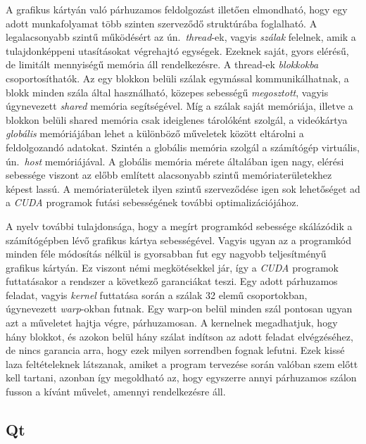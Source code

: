 \documentclass[a4paper,12pt]{article}
\begin{document}
A grafikus kártyán való párhuzamos feldolgozást illetően elmondható, hogy egy adott munkafolyamat több szinten szerveződő struktúrába foglalható.  A legalacsonyabb szintű működésért az ún.\ \emph{thread}-ek, vagyis \emph{szálak} felelnek, amik a tulajdonképpeni utasításokat végrehajtó egységek. Ezeknek saját, gyors elérésű, de limitált mennyiségű memória áll rendelkezésre. A thread-ek \emph{blokkokba} csoportosíthatók. Az egy blokkon belüli szálak egymással kommunikálhatnak, a blokk minden szála által használható, közepes sebességű \emph{megosztott}, vagyis úgynevezett \emph{shared} memória segítségével. Míg a szálak saját memóriája, illetve a blokkon belüli shared memória csak ideiglenes tárolóként szolgál, a videókártya \emph{globális} memóriájában lehet a különböző műveletek között eltárolni a feldolgozandó adatokat. Szintén a globális memória szolgál a számítógép virtuális, ún.\ \emph{host} memóriájával. A globális memória mérete általában igen nagy, elérési sebessége viszont az előbb említett alacsonyabb szintű memóriaterületekhez képest lassú. A memóriaterületek ilyen szintű szerveződése igen sok lehetőséget ad a \emph{CUDA} programok futási sebességének további optimalizációjához.

A nyelv további tulajdonsága, hogy a megírt programkód sebessége skálázódik a számítógépben lévő grafikus kártya sebességével. Vagyis ugyan az a programkód minden féle módosítás nélkül is gyorsabban fut egy nagyobb teljesítményű grafikus kártyán. Ez viszont némi megkötésekkel jár, így a \emph{CUDA} programok futtatásakor a rendszer a következő garanciákat teszi. Egy adott párhuzamos feladat, vagyis \emph{kernel} futtatása során a szálak 32 elemű csoportokban, úgynevezett \emph{warp}-okban futnak. Egy warp-on belül minden szál pontosan ugyan azt a műveletet hajtja végre, párhuzamosan. A kernelnek megadhatjuk, hogy hány blokkot, és azokon belül hány szálat indítson az adott feladat elvégzéséhez, de nincs garancia arra, hogy ezek milyen sorrendben fognak lefutni. Ezek kissé laza feltételeknek látszanak, amiket a program tervezése során valóban szem előtt kell tartani, azonban így megoldható az, hogy egyszerre annyi párhuzamos szálon fusson a kívánt művelet, amennyi rendelkezésre áll.

\subsection{Qt}
\end{document}
